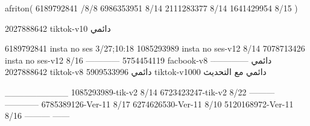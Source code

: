 afriton(
6189792841 /8/8
6986353951 8/14
2111283377 8/14
1641429954 8/15
)

2027888642 tiktok-v10
دائمي

6189792841 insta no ses
3/27;10:18
1085293989 insta no ses-v12
8/14
7078713426 insta no ses-v12
8/16
------------
5754454119 facbook-v8
دائمي
--------------
2027888642 tiktok-v8
دائمي
5909533996 tiktok-v1000
دائمي مع التحديث

__________
1085293989-tik-v2
8/14
6723423247-tik-v2
8/22
---------
------------
6785389126-Ver-11
8/17
6274626530-Ver-11
8/10
5120168972-Ver-11
8/16
---------
------
